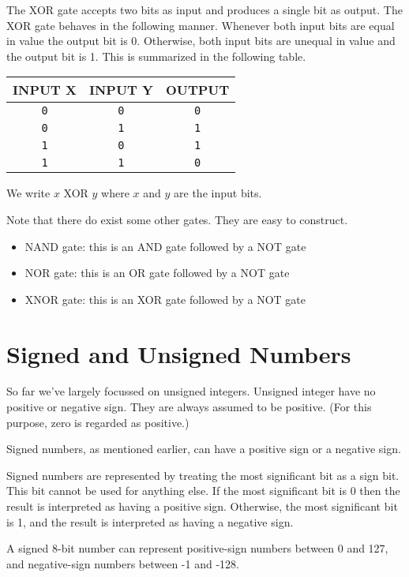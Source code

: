 The XOR gate accepts two bits as input and produces a single bit as output. The XOR gate behaves in the following manner. Whenever both input bits are equal in value the output bit is 0. Otherwise, both input bits are unequal in value and the output bit is 1. This is summarized in the following table.
\begin{center}
	\begin{tabular}{cc|c}
	  \hline
		INPUT X & INPUT Y & OUTPUT \\ \hline
		\texttt{0} & \texttt{0} & \texttt{0} \\ \hline
		\texttt{0} & \texttt{1} & \texttt{1} \\ \hline
		\texttt{1} & \texttt{0} & \texttt{1} \\ \hline
		\texttt{1} & \texttt{1} & \texttt{0} \\ \hline
	\end{tabular}
\end{center}

We write $x$ XOR $y$ where $x$ and $y$ are the input bits.

Note that there do exist some other gates. They are easy to construct.
\begin{itemize}
  \item NAND gate: this is an AND gate followed by a NOT gate
  \item NOR gate: this is an OR gate followed by a NOT gate
  \item XNOR gate: this is an XOR gate followed by a NOT gate
\end{itemize}

\section{Signed and Unsigned Numbers}
So far we've largely focussed on unsigned integers. Unsigned integer have no positive or negative sign. They are always assumed to be positive. (For this purpose, zero is regarded as positive.)

Signed numbers, as mentioned earlier, can have a positive sign or a negative sign.

Signed numbers are represented by treating the most significant bit as a sign bit. This bit cannot be used for anything else. If the most significant bit is 0 then the result is interpreted as having a positive sign. Otherwise, the most significant bit is 1, and the result is interpreted as having a negative sign.

A signed 8-bit number can represent positive-sign numbers between 0 and 127, and negative-sign numbers between -1 and -128.


